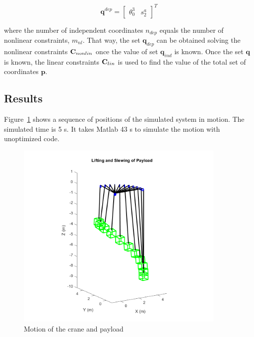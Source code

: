 \begin{equation} 
{{\mathbf{q}}^{dep}} = {\left[ {\begin{array}{*{20}{c}}
{{\theta_{0}^{3}}}&{s_2^a}
\end{array}} \right]^T}
\label{Dep}
\end{equation}

where the number of independent coordinates $n_{dep}$ equals the number of nonlinear constraints, $m_{nl}$. That way, the set $\textbf{q}_{dep}$ can be obtained solving the nonlinear constraints ${\bf{C}}_{nonlin}$ once the value of set $\textbf{q}_{ind}$ is known. Once the set $\textbf{q}$ is known, the linear constraints ${\bf{C}}_{lin}$ is used to find the value of the total set of coordinates $\textbf{p}$.

\subsection{Results}

Figure~\ref{fig:craneLiftingSlewing} shows a sequence of positions of the simulated system in motion. The simulated time is 5 s. It takes Matlab 43 s to simulate the motion with unoptimized code.

\begin{figure}
    \centering
    \includegraphics[width=0.9\textwidth]{Figures/craneLiftingSlewing.png}
    \caption{Motion of the crane and payload}
    \label{fig:craneLiftingSlewing}
\end{figure}







